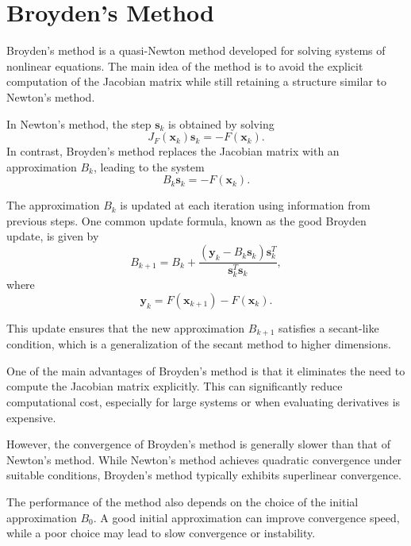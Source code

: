 \section{Broyden's Method}

Broyden's method is a quasi-Newton method developed for solving systems of nonlinear equations. The main idea of the method is to avoid the explicit computation of the Jacobian matrix while still retaining a structure similar to Newton's method.

In Newton's method, the step \( \mathbf{s}_k \) is obtained by solving
\begin{equation}
J_F(\mathbf{x}_k)\mathbf{s}_k = -F(\mathbf{x}_k).
\end{equation}
In contrast, Broyden's method replaces the Jacobian matrix with an approximation \( B_k \), leading to the system
\begin{equation}
B_k \mathbf{s}_k = -F(\mathbf{x}_k).
\end{equation}

The approximation \( B_k \) is updated at each iteration using information from previous steps. One common update formula, known as the good Broyden update, is given by
\begin{equation}
B_{k+1} = B_k + \frac{(\mathbf{y}_k - B_k \mathbf{s}_k)\mathbf{s}_k^T}{\mathbf{s}_k^T \mathbf{s}_k},
\end{equation}
where
\begin{equation}
\mathbf{y}_k = F(\mathbf{x}_{k+1}) - F(\mathbf{x}_k).
\end{equation}

This update ensures that the new approximation \( B_{k+1} \) satisfies a secant-like condition, which is a generalization of the secant method to higher dimensions.

One of the main advantages of Broyden's method is that it eliminates the need to compute the Jacobian matrix explicitly. This can significantly reduce computational cost, especially for large systems or when evaluating derivatives is expensive.

However, the convergence of Broyden's method is generally slower than that of Newton's method. While Newton's method achieves quadratic convergence under suitable conditions, Broyden's method typically exhibits superlinear convergence.

The performance of the method also depends on the choice of the initial approximation \( B_0 \). A good initial approximation can improve convergence speed, while a poor choice may lead to slow convergence or instability.

